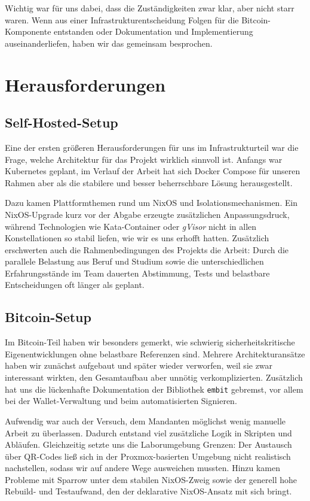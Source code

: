 Wichtig war für uns dabei, dass die Zuständigkeiten zwar klar, aber nicht starr waren. Wenn aus einer Infrastrukturentscheidung Folgen für die Bitcoin-Komponente entstanden oder Dokumentation und Implementierung auseinanderliefen, haben wir das gemeinsam besprochen. 


\section{Herausforderungen}
\subsection{Self-Hosted-Setup}
Eine der ersten größeren Herausforderungen für uns im Infrastrukturteil war die Frage, welche Architektur für das Projekt wirklich sinnvoll ist. Anfangs war Kubernetes geplant, im Verlauf der Arbeit hat sich Docker Compose für unseren Rahmen aber als die stabilere und besser beherrschbare Lösung herausgestellt.

Dazu kamen Plattformthemen rund um NixOS und Isolationsmechanismen. Ein NixOS-Upgrade kurz vor der Abgabe erzeugte zusätzlichen Anpassungsdruck, während Technologien wie Kata-Container oder \textit{gVisor} nicht in allen Konstellationen so stabil liefen, wie wir es uns erhofft hatten. Zusätzlich erschwerten auch die Rahmenbedingungen des Projekts die Arbeit: Durch die parallele Belastung aus Beruf und Studium sowie die unterschiedlichen Erfahrungsstände im Team dauerten Abstimmung, Tests und belastbare Entscheidungen oft länger als geplant.

\subsection{Bitcoin-Setup}
Im Bitcoin-Teil haben wir besonders gemerkt, wie schwierig sicherheitskritische Eigenentwicklungen ohne belastbare Referenzen sind. Mehrere Architekturansätze haben wir zunächst aufgebaut und später wieder verworfen, weil sie zwar interessant wirkten, den Gesamtaufbau aber unnötig verkomplizierten. Zusätzlich hat uns die lückenhafte Dokumentation der Bibliothek \texttt{embit} gebremst, vor allem bei der Wallet-Verwaltung und beim automatisierten Signieren.

Aufwendig war auch der Versuch, dem Mandanten möglichst wenig manuelle Arbeit zu überlassen. Dadurch entstand viel zusätzliche Logik in Skripten und Abläufen. Gleichzeitig setzte uns die Laborumgebung Grenzen: Der Austausch über QR-Codes ließ sich in der Proxmox-basierten Umgebung nicht realistisch nachstellen, sodass wir auf andere Wege ausweichen mussten. Hinzu kamen Probleme mit Sparrow unter dem stabilen NixOS-Zweig sowie der generell hohe Rebuild- und Testaufwand, den der deklarative NixOS-Ansatz mit sich bringt.

